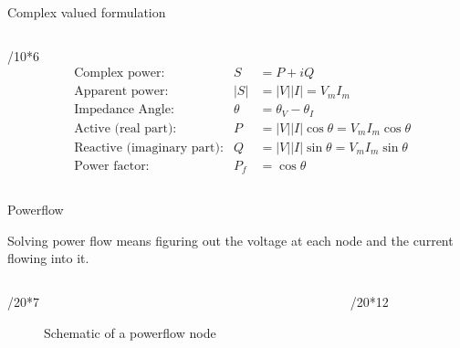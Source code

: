 \documentclass[final]{beamer}
\newlength{\colwidth}
\begin{document}
\begin{frame}[t]
\begin{columns}[t]
\begin{column}{\colwidth}
\begin{alertblock}{Complex valued formulation}
\begin{columns}[t]
\begin{column}{\colwidth/10*6}
        \begin{equation}
          \begin{aligned}
              &\text{Complex power:}    &S       &= P + i Q\\
              &\text{Apparent power:}   &|S|     &= |V||I| = V_m I_m\\
              &\text{Impedance Angle:}  &\theta  &= \theta_V-\theta_I \\
              &\text{Active (real part):}     &P       &= |V||I| \cos{\theta} = V_m I_m\cos{\theta} \\
              &\text{Reactive (imaginary part):}   &Q       &= |V||I| \sin{\theta} = V_m I_m\sin{\theta}\\
              &\text{Power factor:}     &P_f     &= \cos{\theta}
          \end{aligned}
        \end{equation}
      \end{column}

    \end{columns}
  \end{alertblock}

  \begin{block}{Powerflow}
    

    Solving power flow means figuring out the voltage at each node and the
    current flowing into it.

    \begin{columns}[t]
      
    \begin{column}{\colwidth/20*7}

      \begin{figure}
        \centering
        
        \caption{Schematic of a powerflow node\autocite{power_system_analysis}}
      \end{figure}

    \end{column}

    \begin{column}{\colwidth/20*12}


\end{column}
\end{columns}
\end{block}
\end{column}
\end{columns}
\end{frame}
\end{document}
